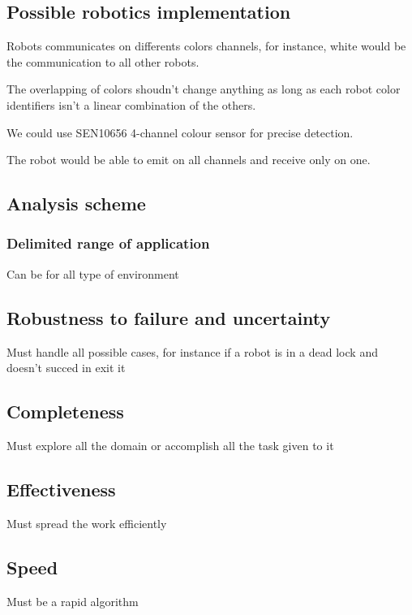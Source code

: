 \documentclass[../main.tex]{subfiles}
\begin{document}
\subsection{Possible robotics implementation}
Robots communicates on differents colors channels, for instance, white would be the communication to all other robots.

The overlapping of colors shoudn't change anything as long as each robot color identifiers isn't a linear combination of the others.

We could use SEN10656 4-channel colour sensor for precise detection.

The robot would be able to emit on all channels and receive only on one.


\subsection{Analysis scheme}

\subsubsection{Delimited range of application}
Can be for all type of environment

\subsection{Robustness to failure and uncertainty}
Must handle all possible cases, for instance if a robot is in a dead lock and doesn't succed in exit it

\subsection{Completeness}
Must explore all the domain or accomplish all the task given to it

\subsection{Effectiveness}
Must spread the work efficiently

\subsection{Speed}
Must be a rapid algorithm
\end{document}
